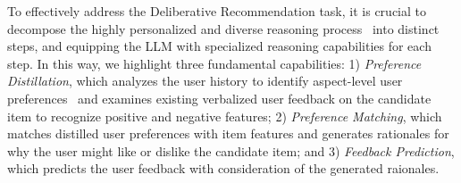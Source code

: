





To effectively address the Deliberative Recommendation task, it is crucial to decompose the highly personalized and diverse reasoning process~\cite{Wang0WWF022} into distinct steps, and equipping the LLM with specialized reasoning capabilities for each step. In this way, we highlight three fundamental capabilities: 
1) \textit{Preference Distillation}, which analyzes the user history to identify aspect-level user preferences~\cite{guan2019attentive} and examines existing verbalized user feedback on the candidate item to recognize positive and negative features; 
2) \textit{Preference Matching}, which matches distilled user preferences with item features and generates rationales for why the user might like or dislike the candidate item; 
and 3) \textit{Feedback Prediction}, which predicts the user feedback with consideration of the generated raionales.

 


